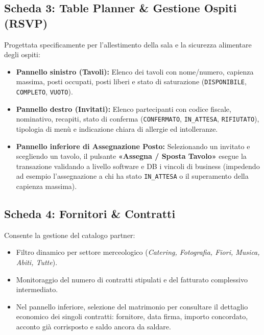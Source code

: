 \subsection{Scheda 3: Table Planner \& Gestione Ospiti (RSVP)}
Progettata specificamente per l'allestimento della sala e la sicurezza alimentare degli ospiti:
\begin{itemize}[noitemsep]
    \item \textbf{Pannello sinistro (Tavoli):} Elenco dei tavoli con nome/numero, capienza massima, posti occupati, posti liberi e stato di saturazione (\texttt{DISPONIBILE}, \texttt{COMPLETO}, \texttt{VUOTO}).
    \item \textbf{Pannello destro (Invitati):} Elenco partecipanti con codice fiscale, nominativo, recapiti, stato di conferma (\texttt{CONFERMATO}, \texttt{IN\_ATTESA}, \texttt{RIFIUTATO}), tipologia di menù e indicazione chiara di allergie ed intolleranze.
    \item \textbf{Pannello inferiore di Assegnazione Posto:} Selezionando un invitato e scegliendo un tavolo, il pulsante \textbf{«Assegna / Sposta Tavolo»} esegue la transazione validando a livello software e DB i vincoli di business (impedendo ad esempio l'assegnazione a chi ha stato \texttt{IN\_ATTESA} o il superamento della capienza massima).
\end{itemize}

\subsection{Scheda 4: Fornitori \& Contratti}
Consente la gestione del catalogo partner:
\begin{itemize}[noitemsep]
    \item Filtro dinamico per settore merceologico (\textit{Catering, Fotografia, Fiori, Musica, Abiti, Tutte}).
    \item Monitoraggio del numero di contratti stipulati e del fatturato complessivo intermediato.
    \item Nel pannello inferiore, selezione del matrimonio per consultare il dettaglio economico dei singoli contratti: fornitore, data firma, importo concordato, acconto già corrisposto e saldo ancora da saldare.
\end{itemize}

